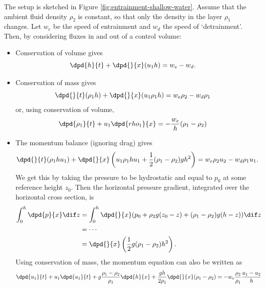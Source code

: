 The setup is sketched in Figure \ref{fig:entrainment-shallow-water}. Assume that the ambient fluid density $\rho_2$ is constant, so that only the density in the layer $\rho_1$ changes. Let $w_e$ be the speed of entrainment and $w_d$ the speed of `detrainment'. Then, by considering fluxes in and out of a control volume:
\begin{itemize}
	\item Conservation of volume gives
	\begin{equation}
		\dpd{h}{t} + \dpd{}{x} (u_1 h) = w_e - w_d.
	\end{equation}
	\item Conservation of mass gives
	\begin{equation}
		\dpd{}{t} (\rho_1h) + \dpd{}{x} (u_1\rho_1h) = w_e\rho_2 - w_d\rho_1
	\end{equation}
	or, using conservation of volume,
	\begin{equation}
		\dpd{\rho_1}{t} + u_1 \dpd{rho_1}{x} = -\frac{w_e}{h} (\rho_1 - \rho_2)
		\label{swentrain-mass}
	\end{equation}
	\item The momentum balance (ignoring drag) gives
	\begin{equation}
		\dpd{}{t} (\rho_1 hu_1) + \dpd{}{x}\left(
			u_1 \rho_1 hu_1 + \frac{1}{2}(\rho_1 - \rho_2)gh^2 
		\right) = w_e \rho_2 u_2 - w_d \rho_1 u_1.
	\end{equation}
	We get this by taking the pressure to be hydrostatic and equal to $p_0$ at some reference height $z_0$. Then the horizontal pressure gradient, integrated over the horizontal cross section, is 
	\begin{align}
		\int_0^h \dpd{p}{x}\dif z &= \int_0^h \dpd{}{x} (p_0 + \rho_2g(z_0-z) + (\rho_1-\rho_2)g(h-z)) \dif z \\
			&= \cdots \\
			&= \dpd{}{x} \left( \frac{1}{2}g(\rho_1-\rho_2)h^2\right).
	\end{align}
	Using conservation of mass, the momentum equation can also be written as
	\begin{equation}
		\dpd{u_1}{t} + u_1\dpd{u_1}{t} + g \frac{\rho_1-\rho_2}{\rho_1} \dpd{h}{x} + \frac{gh}{2\rho_1}\dpd{}{x}(\rho_1-\rho_2)
		 = -w_e \frac{\rho_2}{\rho_1} \frac{u_1 - u_2}{h}
		 \label{swentrain-mom}
	\end{equation}
\end{itemize}

